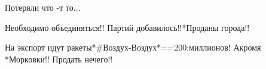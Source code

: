 \begin{itemize}
Потеряли что -т то...


Необходимо объединяться!! Партий добавилось!!*Проданы города!!

На экспорт идут ракеты*\#Воздух-Воздух*==200;миллионов! Акромя *Морковки!!
Продать нечего!!


\end{itemize}

